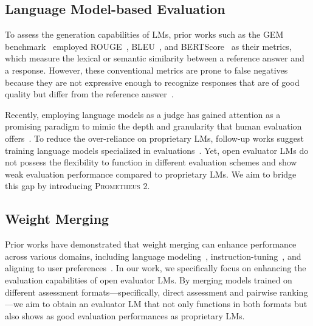 \documentclass[11pt]{article}
\begin{document}
\subsection{Language Model-based Evaluation}

To assess the generation capabilities of LMs, prior works such as the GEM benchmark~\citep{gehrmann2021gem,gehrmann2022gemv2} employed ROUGE~\citep{lin2004rouge}, BLEU~\citep{papineni2002bleu}, and BERTScore~\citep{zhang2019bertscore} as their metrics, which measure the lexical or semantic similarity between a reference answer and a response. However, these conventional metrics are prone to false negatives because they are not expressive enough to recognize responses that are of good quality but differ from the reference answer~\citep{schluter2017limits, freitag2020bleu, hanna2021fine}.

Recently, employing language models as a judge has gained attention as a promising paradigm to mimic the depth and granularity that human evaluation offers~\citep{zheng2023judging, liu2023gpteval, alpaca_eval,  chan2023chateval, ye2023flask}. To reduce the over-reliance on proprietary LMs, follow-up works suggest training language models specialized in evaluations~\citep{cui2023ultrafeedback,kim2023prometheus,jiang2023tigerscore,jiang2023llm,li2023generative,lee2024prometheus}. Yet, open evaluator LMs do not possess the flexibility to function in different evaluation schemes and show weak evaluation performance compared to proprietary LMs. We aim to bridge this gap by introducing \textsc{Prometheus 2}.

\subsection{Weight Merging}

Prior works have demonstrated that weight merging can enhance performance across various domains, including language modeling~\citep{li2022branch, matena2022merging, ilharco2022editing, don2022cold, gururangan2023scaling, yadav2024ties, sukhbaatar2024branch}, instruction-tuning~\citep{jang2023exploring,yu2023language}, and aligning to user preferences~\citep{jang2023personalized, rame2024rewarded, wang2024arithmetic}. In our work, we specifically focus on enhancing the evaluation capabilities of open evaluator LMs. By merging models trained on different assessment formats—specifically, direct assessment and pairwise ranking—we aim to obtain an evaluator LM that not only functions in both formats but also shows as good evaluation performances as proprietary LMs.
\end{document}
